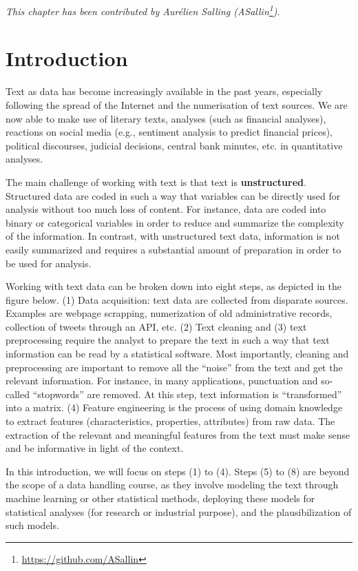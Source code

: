 \documentclass[
  12pt,
]{style/krantz}
\renewcommand{\href}[2]{#2\footnote{\url{#1}}}
\begin{document}
\emph{This chapter has been contributed by Aurélien Salling (\href{https://github.com/ASallin}{ASallin})}.

\hypertarget{introduction-1}{%
\section{Introduction}\label{introduction-1}}

Text as data has become increasingly available in the past years, especially following the spread of the Internet and the numerisation of text sources. We are now able to make use of literary texts, analyses (such as financial analyses), reactions on social media (e.g., sentiment analysis to predict financial prices), political discourses, judicial decisions, central bank minutes, etc. in quantitative analyses.

The main challenge of working with text is that text is \textbf{unstructured}. Structured data are coded in such a way that variables can be directly used for analysis without too much loss of content. For instance, data are coded into binary or categorical variables in order to reduce and summarize the complexity of the information. In contrast, with unstructured text data, information is not easily summarized and requires a substantial amount of preparation in order to be used for analysis.

Working with text data can be broken down into eight steps, as depicted in the figure below. (1) Data acquisition: text data are collected from disparate sources. Examples are webpage scrapping, numerization of old administrative records, collection of tweets through an API, etc. (2) Text cleaning and (3) text preprocessing require the analyst to prepare the text in such a way that text information can be read by a statistical software. Most importantly, cleaning and preprocessing are important to remove all the ``noise'' from the text and get the relevant information. For instance, in many applications, punctuation and so-called ``stopwords'' are removed. At this step, text information is ``transformed'' into a matrix. (4) Feature engineering is the process of using domain knowledge to extract features (characteristics, properties, attributes) from raw data. The extraction of the relevant and meaningful features from the text must make sense and be informative in light of the context.

In this introduction, we will focus on steps (1) to (4). Steps (5) to (8) are beyond the scope of a data handling course, as they involve modeling the text through machine learning or other statistical methods, deploying these models for statistical analyses (for research or industrial purpose), and the plausibilization of such models.
\end{document}
